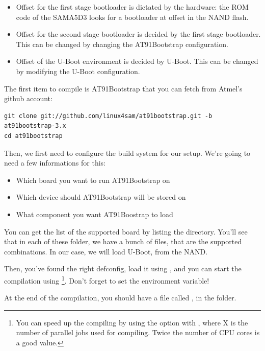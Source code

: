 \begin{itemize}
\item Offset  for the first stage bootloader is dictated by
  the hardware: the ROM code of the SAMA5D3 looks for a bootloader at
  offset  in the NAND flash.
\item Offset  for the second stage bootloader is decided
  by the first stage bootloader. This can be changed by changing the
  AT91Bootstrap configuration.
\item Offset  of the U-Boot environment is decided by
  U-Boot. This can be changed by modifying the U-Boot configuration.
\end{itemize}

The first item to compile is AT91Bootstrap that you can fetch from
Atmel's github account:

\begin{verbatim}
git clone git://github.com/linux4sam/at91bootstrap.git -b at91bootstrap-3.x
cd at91bootstrap
\end{verbatim}

Then, we first need to configure the build system for our setup. We're
going to need a few informations for this:

\begin{itemize}
\item Which board you want to run AT91Bootstrap on
\item Which device should AT91Bootstrap will be stored on
\item What component you want AT91Boostrap to load
\end{itemize}

You can get the list of the supported board by listing the
 directory. You'll see that in each of these folder, we
have a bunch of  files, that are the supported
combinations. In our case, we will load U-Boot, from the NAND.

Then, you've found the right defconfig, load it using
, and you can start the compilation using
\footnote{You can speed up the compiling by using the
   option with , where X is the number of
  parallel jobs used for compiling. Twice the number of CPU cores is a
  good value.}. Don't forget to set the 
environment variable!

At the end of the compilation, you should have a file called
, in the
 folder.

